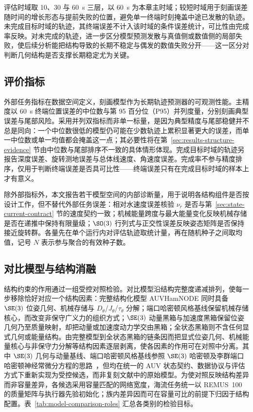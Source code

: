评估时域取 10、30 与 60~s 三层，以 60~s 为本章主时域；较短时域用于刻画误差随时间的增长形态与提前失败的位置，避免单一终端时刻掩盖中途已发散的轨迹。未完成目标时域的轨迹，其终端误差不计入该时域的条件误差统计，可比性由完成率反映。对未完成的轨迹，进一步区分模型预测发散与真值侧或数值侧的局部失败，使后续分析能把结构导致的长期不稳定与偶发的数值失败分开——这一区分对判断几何结构是否支撑长期稳定尤为关键。

\subsection{评价指标}
\label{subsec:metrics}

外部任务指标在数据空间定义，刻画模型作为长期轨迹预测器的可观测性能。主精度以 60~s 终端位置误差的中位数与第 95 百分位（P95）并列度量，分别刻画典型误差与尾部风险。采用并列双指标而非单一标量，是因为典型精度与尾部稳健并不总是同向：一个中位数很低的模型仍可能在少数轨迹上累积显著更大的误差，而单一中位数或单一均值都会掩盖这一点；其必要性将在第~\ref{sec:results-structure-evidence} 节由中位数与尾部排序不一致的具体情形体现。完成目标时域的轨迹另报告深度误差、旋转测地误差与总体线速度、角速度误差。完成率不参与精度排序，仅用于判断终端误差是否具可比性——终端误差只有在完成目标时域的样本上才有意义。

除外部指标外，本文报告若干模型空间的内部诊断量，用于说明各结构组件是否按设计工作，但不替代外部任务误差：相对水速度误差核验 \(\nu_r\) 是否与第~\ref{sec:state-current-contract} 节的速度契约一致；机械能量跨度与最大能量变化反映机械存储是否在递推中保持有限量级；\(\SO(3)\) 行列式与正交性误差反映姿态矩阵是否保持接近旋转群。各量先在单个运行内对评估轨迹取统计量，再在随机种子之间取均值，记号 \(N\) 表示参与聚合的有效种子数。

\subsection{对比模型与结构消融}
\label{subsec:models-ablations}

结构约束的作用通过一组受控对照检验。对比模型沿结构完整度递减排列，使每一步移除恰好对应一个结构因素：完整结构化模型 AUVHamNODE 同时具备 \(\SE(3)\) 位姿几何、机械存储与 \(D_\theta\)/\(J_\theta\)/\(\tau_\theta\) 分解；端口哈密顿风格基线保留机械存储核心，而改变非保守广义力的组织方式；\(\SE(3)\) 动量黑箱与加速度黑箱保留位姿几何乃至质量映射，却把动量或加速度动力学交由黑箱；全状态黑箱则不含任何显式几何或能量结构。由完整模型到全状态黑箱的链条因而把显式位姿几何、机械能量核心与非保守力分解等结构因素逐层剥离，使各因素的作用可在对照中分离。其中 \(\SE(3)\) 几何与动量基线、端口哈密顿风格基线参照 \(\SE(3)\) 哈密顿及李群端口哈密顿神经常微分方程的思路~\citep{duong2021se3hamnode,duong2024liegroupphnode}，但均在统一的 AUV 状态契约、数据协议与评估方式下重新实现为受控候选，而非复刻文献中的原始模型。为使对照反映结构差异而非容量差异，各候选采用容量匹配的网络宽度，海流任务统一以 REMUS~100 的质量矩阵与执行器先验初始化；族内差异因而可在容量可比的前提下归因于结构配置。表~\ref{tab:model-comparison-roles} 汇总各类别的检验目标。

